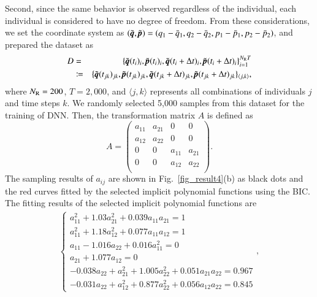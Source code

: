 \documentclass[preprint,
bibnotes,
 amsmath,amssymb,
 aps,
]{revtex4-1}
\begin{document}
Second, since the same behavior is observed regardless of the individual, each individual is considered to have no degree of freedom. 
From these considerations, we set the coordinate system as $(\tilde{\textit{\textbf{q}}},\tilde{\textit{\textbf{p}}}) = (q_1 - \bar{q}_1, q_2 - \bar{q}_2, p_1 - \bar{p}_1, p_2 - \bar{p}_2)$, and prepared the dataset as 
\begin{eqnarray}
D &=& \{\tilde{\textit{\textbf{q}}}(t_i)_i,\tilde{\textit{\textbf{p}}}(t_i)_i,\tilde{\textit{\textbf{q}}}(t_i+\Delta t)_i,\tilde{\textit{\textbf{p}}}(t_i+\Delta t)_i\}_{i = 1}^{N_{\rm R}T}\\
&\coloneqq& \{\tilde{\textit{\textbf{q}}}(t_{jk})_{jk},\tilde{\textit{\textbf{p}}}(t_{jk})_{jk},\tilde{\textit{\textbf{q}}}(t_{jk}+\Delta t)_{jk},\tilde{\textit{\textbf{p}}}(t_{jk}+\Delta t)_{jk}\}_{\langle{}j,k\rangle{}},
\end{eqnarray}
where $N_{\rm R} = 200$, $T = 2,000$, and $\langle{}j,k\rangle{}$ represents all combinations of individuals $j$ and time steps $k$. 
We randomly selected 5,000 samples from this dataset for the training of DNN. 
Then, the transformation matrix $A$ is defined as 
\begin{equation}
A = 
  \left(
    \begin{array}{cccc}
      a_{11} & a_{21} & 0 & 0\\
      a_{12} & a_{22} & 0 & 0\\
      0 & 0 & a_{11} & a_{21}\\
      0 & 0 & a_{12} & a_{22}\\
    \end{array}
  \right). 
\end{equation}
The sampling results of $a_{ij}$ are shown in Fig.~\ref{fig_result4}(b) as black dots and the red curves fitted by the selected implicit polynomial functions using the BIC. 
The fitting results of the selected implicit polynomial functions are 
\begin{eqnarray}
\begin{cases}
a_{11}^2 + 1.03a_{21}^2 + 0.039a_{11}a_{21} = 1\\
a_{11}^2 + 1.18a_{12}^2 + 0.077 a_{11}a_{12} = 1\\
a_{11} - 1.016a_{22} + 0.016a_{11}^2 = 0\\
a_{21} + 1.077a_{12} = 0\\
-0.038a_{22} + a_{21}^2 + 1.005a_{22}^2 + 0.051a_{21}a_{22} = 0.967\\
-0.031a_{22} + a_{12}^2 + 0.877a_{22}^2 + 0.056a_{12}a_{22} = 0.845
\end{cases},
\end{eqnarray}
\end{document}

